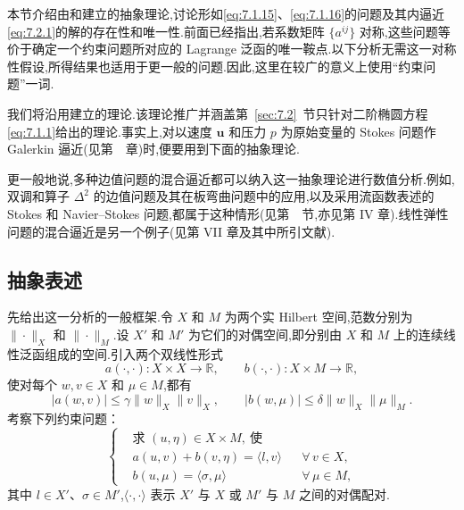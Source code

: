 本节介绍由和建立的抽象理论,讨论形如\eqref{eq:7.1.15}、\eqref{eq:7.1.16}的问题及其内逼近\eqref{eq:7.2.1}的解的存在性和唯一性.前面已经指出,若系数矩阵 \(\{a^{ij}\}\) 对称,这些问题等价于确定一个约束问题所对应的 Lagrange 泛函的唯一鞍点.以下分析无需这一对称性假设,所得结果也适用于更一般的问题.因此,这里在较广的意义上使用“约束问题”一词.

我们将沿用建立的理论.该理论推广并涵盖第~\ref{sec:7.2}~节只针对二阶椭圆方程\eqref{eq:7.1.1}给出的理论.事实上,对以速度 \(\boldsymbol{u}\) 和压力 \(p\) 为原始变量的 Stokes 问题作 Galerkin 逼近(见第~~章)时,便要用到下面的抽象理论.

更一般地说,多种边值问题的混合逼近都可以纳入这一抽象理论进行数值分析.例如,双调和算子 \(\Delta^2\) 的边值问题及其在板弯曲问题中的应用,以及采用流函数表述的 Stokes 和 Navier--Stokes 问题,都属于这种情形(见第~~节,亦见第 IV 章).线性弹性问题的混合逼近是另一个例子(见第 VII 章及其中所引文献).

\subsection{抽象表述}\label{sec:7.4.1}

先给出这一分析的一般框架.令 \(X\) 和 \(M\) 为两个实 Hilbert 空间,范数分别为 \(\|\cdot\|_X\) 和 \(\|\cdot\|_M\).设 \(X'\) 和 \(M'\) 为它们的对偶空间,即分别由 \(X\) 和 \(M\) 上的连续线性泛函组成的空间.引入两个双线性形式
\begin{equation}\label{eq:7.4.1}
  a(\cdot,\cdot)\colon X\times X\to\mathbb R,\qquad
  b(\cdot,\cdot)\colon X\times M\to\mathbb R,
\end{equation}
使对每个 \(w,v\in X\) 和 \(\mu\in M\),都有
\begin{equation}\label{eq:7.4.2}
  |a(w,v)|\le\gamma\|w\|_X\|v\|_X,\qquad
  |b(w,\mu)|\le\delta\|w\|_X\|\mu\|_M.
\end{equation}
考察下列约束问题：
\begin{equation}\label{eq:7.4.3}
  \left\{
  \begin{aligned}
    &\text{求 }(u,\eta)\in X\times M,\ \text{使}\\
    &a(u,v)+b(v,\eta)=\langle l,v\rangle&&\forall\,v\in X,\\
    &b(u,\mu)=\langle\sigma,\mu\rangle&&\forall\,\mu\in M,
  \end{aligned}
  \right.
\end{equation}
其中 \(l\in X'\)、\(\sigma\in M'\),\(\langle\cdot,\cdot\rangle\) 表示 \(X'\) 与 \(X\) 或 \(M'\) 与 \(M\) 之间的对偶配对.

